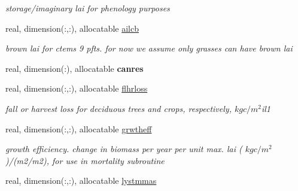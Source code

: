 \begin{DoxyCompactItemize}
\begin{DoxyCompactList}\small\item\em storage/imaginary lai for phenology purposes \end{DoxyCompactList}\item 
\hypertarget{structctem__statevars_1_1veg__gat_ad7c09fc4054fbd66ac5946eb788f6196}{}real, dimension(\+:,\+:), allocatable \hyperlink{structctem__statevars_1_1veg__gat_ad7c09fc4054fbd66ac5946eb788f6196}{ailcb}\label{structctem__statevars_1_1veg__gat_ad7c09fc4054fbd66ac5946eb788f6196}

\begin{DoxyCompactList}\small\item\em brown lai for ctem\textquotesingle{}s 9 pfts. for now we assume only grasses can have brown lai \end{DoxyCompactList}\item 
\hypertarget{structctem__statevars_1_1veg__gat_ac3efe48505c9a66cf270ad3d4cbfff9b}{}real, dimension(\+:), allocatable {\bfseries canres}\label{structctem__statevars_1_1veg__gat_ac3efe48505c9a66cf270ad3d4cbfff9b}

\item 
\hypertarget{structctem__statevars_1_1veg__gat_a4138f3446187a04a02e37b16c976d544}{}real, dimension(\+:,\+:), allocatable \hyperlink{structctem__statevars_1_1veg__gat_a4138f3446187a04a02e37b16c976d544}{flhrloss}\label{structctem__statevars_1_1veg__gat_a4138f3446187a04a02e37b16c976d544}

\begin{DoxyCompactList}\small\item\em fall or harvest loss for deciduous trees and crops, respectively, $kg c/m^2$il1 \end{DoxyCompactList}\item 
\hypertarget{structctem__statevars_1_1veg__gat_af0398c580fa5ffdbd29992e25dc2d75a}{}real, dimension(\+:,\+:), allocatable \hyperlink{structctem__statevars_1_1veg__gat_af0398c580fa5ffdbd29992e25dc2d75a}{grwtheff}\label{structctem__statevars_1_1veg__gat_af0398c580fa5ffdbd29992e25dc2d75a}

\begin{DoxyCompactList}\small\item\em growth efficiency. change in biomass per year per unit max. lai ( $kg c/m^2$)/(m2/m2), for use in mortality subroutine \end{DoxyCompactList}\item 
\hypertarget{structctem__statevars_1_1veg__gat_ab9e0ed17b680c8c61acc7c5bfe2bca53}{}real, dimension(\+:,\+:), allocatable \hyperlink{structctem__statevars_1_1veg__gat_ab9e0ed17b680c8c61acc7c5bfe2bca53}{lystmmas}\label{structctem__statevars_1_1veg__gat_ab9e0ed17b680c8c61acc7c5bfe2bca53}


\end{DoxyCompactItemize}
